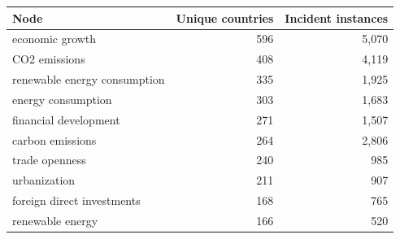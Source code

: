 \begin{tabular}{p{7.5cm}rr}
\toprule
Node & Unique countries & Incident instances \\
\midrule
economic growth & 596 & 5,070 \\
CO2 emissions & 408 & 4,119 \\
renewable energy consumption & 335 & 1,925 \\
energy consumption & 303 & 1,683 \\
financial development & 271 & 1,507 \\
carbon emissions & 264 & 2,806 \\
trade openness & 240 & 985 \\
urbanization & 211 & 907 \\
foreign direct investments & 168 & 765 \\
renewable energy & 166 & 520 \\
\bottomrule
\end{tabular}
